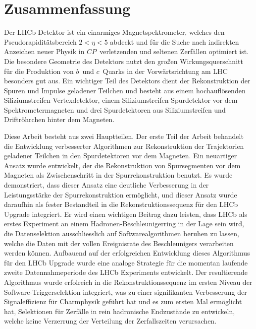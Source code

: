 \clearpage

\section*{Zusammenfassung}

Der LHCb Detektor ist ein einarmiges Magnetspektrometer, welches den
Pseudorapidit{\"a}tsbereich $2 < \eta < 5$ abdeckt und f{\"u}r die Suche nach
indirekten Anzeichen neuer Physik in $C\!P$~verletzenden und seltenen
Zerf{\"a}llen optimiert ist. Die besondere Geometrie des Detektors nutzt den
gro{\ss}en Wirkungsquerschnitt f{\"u}r die Produktion von $b$~und $c$~Quarks
in der Vorw{\"a}rtsrichtung am LHC besonders gut aus. Ein wichtiger Teil des
Detektors dient der Rekonstruktion der Spuren und Impulse geladener Teilchen
und besteht aus einem hochaufl{\"o}senden Siliziumstreifen-Vertexdetektor,
einem Siliziumstreifen-Spurdetektor vor dem Spektrometermagneten und drei
Spurdetektoren aus Siliziumstreifen und Driftr{\"o}hrchen hinter dem Magneten.

Diese Arbeit besteht aus zwei Hauptteilen. Der erste Teil der Arbeit behandelt
die Entwicklung verbesserter Algorithmen zur Rekonstruktion der Trajektorien
geladener Teilchen in den Spurdetektoren vor dem Magneten. Ein neuartiger
Ansatz wurde entwickelt, der die Rekonstruktion von Spursegmenten vor dem
Magneten als Zwischenschritt in der Spurrekonstruktion benutzt. Es wurde
demonstriert, dass dieser Ansatz eine deutliche Verbesserung in der
Leistungsst{\"a}rke der Spurrekonstruktion erm{\"o}glicht, und dieser Ansatz
wurde daraufhin als fester Bestandteil in die Rekonstruktionssequenz f{\"ur}
den LHCb Upgrade integriert. Er wird einen wichtigen Beitrag dazu leisten,
dass LHCb als erstes Experiment an einem Hadronen-Beschleunigerring in der
Lage sein wird, die Datenselektion ausschliesslich auf Softwarealgorithmen
beruhen zu lassen, welche die Daten mit der vollen Ereignisrate des
Beschleunigers verarbeiten werden k{\"o}nnen.  Aufbauend auf der erfolgreichen
Entwicklung dieses Algorithmus f{\"u}r den LHCb Upgrade wurde eine analoge
Strategie f{\"u}r die momentan laufende zweite Datennahmeperiode des LHCb
Experiments entwickelt. Der resultierende Algorithmus wurde erfolreich in die
Rekonstruktionssequenz im ersten Niveau der Software-Triggerselektion
integriert, was zu einer signifikanten Verbesserung der Signaleffizienz
f{\"ur} Charmphysik gef{\"u}hrt hat und es zum ersten Mal erm{\"o}glicht hat,
Selektionen f{\"u}r Zerf{\"a}lle in rein hadronische Endzust{\"a}nde zu
entwickeln, welche keine Verzerrung der Verteilung der Zerfallszeiten
verursachen.

